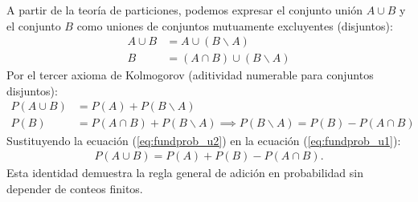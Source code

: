 \begin{solproblema}[prob:1f335a1]
	A partir de la teoría de particiones, podemos expresar el conjunto unión $A \cup B$ y el conjunto $B$ como uniones de conjuntos mutuamente excluyentes (disjuntos):
	\begin{align}
		A \cup B &= A \cup (B \backslash A) \\
		B &= (A \cap B) \cup (B \backslash A)
	\end{align}
	Por el tercer axioma de Kolmogorov (aditividad numerable para conjuntos disjuntos):
	\begin{align}
		P(A \cup B) &= P(A) + P(B \backslash A) \label{eq:fundprob_u1} \\
		P(B) &= P(A \cap B) + P(B \backslash A) \implies P(B \backslash A) = P(B) - P(A \cap B) \label{eq:fundprob_u2}
	\end{align}
	Sustituyendo la ecuación (\ref{eq:fundprob_u2}) en la ecuación (\ref{eq:fundprob_u1}):
	\begin{align}
		P(A \cup B) = P(A) + P(B) - P(A \cap B).
	\end{align}
	Esta identidad demuestra la regla general de adición en probabilidad sin depender de conteos finitos.
\end{solproblema}


